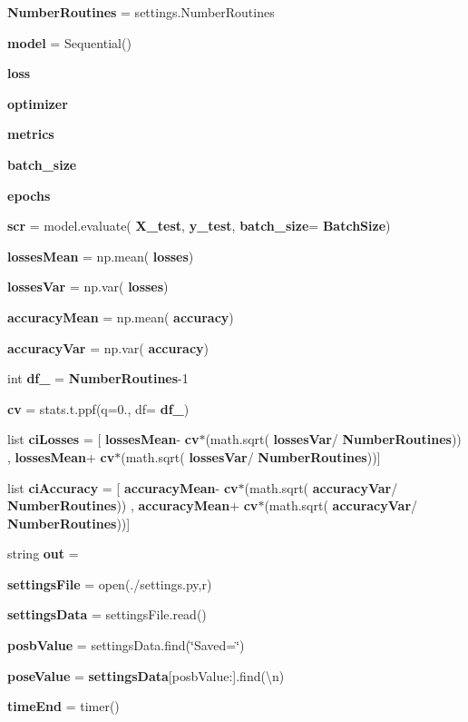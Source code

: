 \begin{DoxyCompactItemize}
\item 
\textbf{ Number\+Routines} = settings.\+Number\+Routines
\item 
\textbf{ model} = Sequential()
\item 
\textbf{ loss}
\item 
\textbf{ optimizer}
\item 
\textbf{ metrics}
\item 
\textbf{ batch\+\_\+size}
\item 
\textbf{ epochs}
\item 
\textbf{ scr} = model.\+evaluate(\textbf{ X\+\_\+test}, \textbf{ y\+\_\+test}, \textbf{ batch\+\_\+size}=\textbf{ Batch\+Size})
\item 
\textbf{ losses\+Mean} = np.\+mean(\textbf{ losses})
\item 
\textbf{ losses\+Var} = np.\+var(\textbf{ losses})
\item 
\textbf{ accuracy\+Mean} = np.\+mean(\textbf{ accuracy})
\item 
\textbf{ accuracy\+Var} = np.\+var(\textbf{ accuracy})
\item 
int \textbf{ df\+\_\+} = \textbf{ Number\+Routines}-\/1
\item 
\textbf{ cv} = stats.\+t.\+ppf(q=0., df=\textbf{ df\+\_\+})
\item 
list \textbf{ ci\+Losses} = [\textbf{ losses\+Mean}-\/\textbf{ cv}$\ast$(math.\+sqrt(\textbf{ losses\+Var}/\textbf{ Number\+Routines})) ,\textbf{ losses\+Mean}+\textbf{ cv}$\ast$(math.\+sqrt(\textbf{ losses\+Var}/\textbf{ Number\+Routines}))]
\item 
list \textbf{ ci\+Accuracy} = [\textbf{ accuracy\+Mean}-\/\textbf{ cv}$\ast$(math.\+sqrt(\textbf{ accuracy\+Var}/\textbf{ Number\+Routines})) ,\textbf{ accuracy\+Mean}+\textbf{ cv}$\ast$(math.\+sqrt(\textbf{ accuracy\+Var}/\textbf{ Number\+Routines}))]
\item 
string \textbf{ out} = \textquotesingle{}\textquotesingle{}
\item 
\textbf{ settings\+File} = open(\textquotesingle{}./settings.\+py\textquotesingle{},\textquotesingle{}r\textquotesingle{})
\item 
\textbf{ settings\+Data} = settings\+File.\+read()
\item 
\textbf{ posb\+Value} = settings\+Data.\+find(\char`\"{}Saved=\char`\"{})
\item 
\textbf{ pose\+Value} = \textbf{ settings\+Data}[posb\+Value\+:].find(\textquotesingle{}\textbackslash{}n\textquotesingle{})
\item 
\textbf{ time\+End} = timer()
\end{DoxyCompactItemize}


